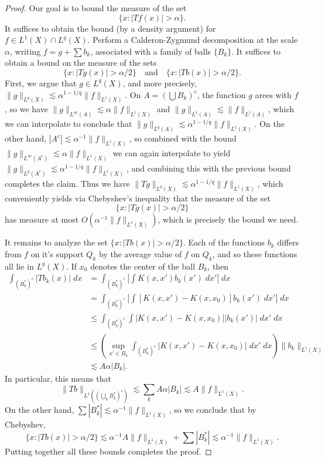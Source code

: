 \begin{proof}
    Our goal is to bound the measure of the set
    \[ \{ x : |Tf(x)| > \alpha \}. \]
    It suffices to obtain the bound (by a density argument) for $f \in L^1(X) \cap L^q(X)$. Perform a Calderon-Zygmund decomposition at the scale $\alpha$, writing $f = g + \sum b_k$, associated with a family of balls $\{ B_k \}$. It suffices to obtain a bound on the measure of the sets
    \[ \{ x : |Tg(x)| > \alpha/2 \} \quad\text{and}\quad \{ x : |Tb(x)| > \alpha/2 \}. \]
    First, we argue that $g \in L^q(X)$, and more precisely, $\| g \|_{L^q(X)} \lesssim \alpha^{1-1/q} \| f \|_{L^1(X)}$. On $A = (\bigcup B_k)^c$, the function $g$ arees with $f$, so we have $\| g \|_{L^\infty(A)} \lesssim \alpha \| f \|_{L^1(X)}$ and $\| g \|_{L^1(A)} \lesssim \| f \|_{L^1(A)}$, which we can interpolate to conclude that $\| g \|_{L^q(A)} \lesssim \alpha^{1-1/q} \| f \|_{L^1(X)}$. On the other hand, $|A^c| \lesssim \alpha^{-1} \| f \|_{L^1(X)}$, so combined with the bound $\| g \|_{L^\infty(A^c)} \lesssim \alpha \| f \|_{L^1(X)}$ we can again interpolate to yield $\| g \|_{L^q(A^c)} \lesssim \alpha^{1-1/q} \| f \|_{L^1(X)}$, and combining this with the previous bound completes the claim. Thus we have $\| Tg \|_{L^q(X)} \lesssim \alpha^{1-1/q} \| f \|_{L^1(X)}$, which conveniently yields via Chebyshev's inequality that the measure of the set
    \[ \{ x : |Tg(x)| > \alpha / 2 \} \]
    has measure at most $O(\alpha^{-1} \| f \|_{L^1(X)})$, which is precisely the bound we need.

    It remains to analyze the set $\{ x : |Tb(x)| > \alpha / 2 \}$. Each of the functions $b_k$ differs from $f$ on it's support $Q_k$ by the average value of $f$ on $Q_k$, and so these functions all lie in $L^q(X)$. If $x_0$ denotes the center of the ball $B_k$, then
    \begin{align*}
        \int_{(B_k^*)^c} |Tb_k(x)|\; dx &= \int_{(B_k^*)^c} \left| \int K(x,x') b_k(x')\; dx' \right|\; dx\\
        &= \int_{(B_k^*)^c} \left| \int [K(x,x') - K(x,x_0)] b_k(x')\; dx' \right|\; dx\\
        &\leq \int_{(B_k^*)^c} \int |K(x,x') - K(x,x_0)| |b_k(x')|\; dx'\; dx\\
        &\leq \left( \sup_{x' \in B_k} \int_{(B_k^*)^c} |K(x,x') - K(x,x_0)|\; dx'\; dx \right) \| b_k \|_{L^1(X)}\\
        &\lesssim A \alpha |B_k|.
    \end{align*}
    In particular, this means that
    \[ \| Tb \|_{L^1((\bigcup_k B_k^*)^c)} \lesssim \sum_k A \alpha |B_k| \lesssim A \| f \|_{L^1(X)}. \]
    On the other hand, $\sum |B_k^*| \lesssim \alpha^{-1} \| f \|_{L^1(X)}$, so we conclude that by Chebyshev,
    \[ \{ x : |Tb(x)| > \alpha / 2 \} \lesssim \alpha^{-1} A \| f \|_{L^1(X)} + \sum |B_k^*| \lesssim \alpha^{-1} \| f \|_{L^1(X)}. \]
    Putting together all these bounds completes the proof.
\end{proof}

